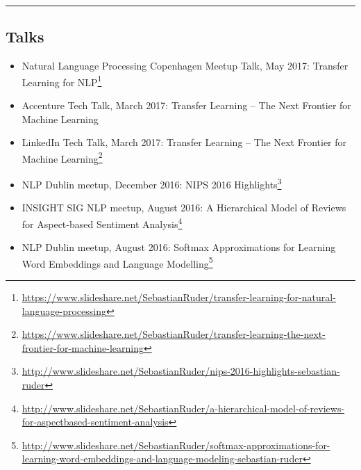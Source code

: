 \documentclass[10pt,letterpaper]{article}
\makeatletter
\newcommand{\headerrow}[2]
{\begin{tabular*}{\linewidth}{l@{\extracolsep{\fill}}r}
	#1 &
	#2 \\
\end{tabular*}}
\makeatother
\begin{document}
%
%	
%

\hrule
\vspace{-0.4em}
\subsection*{Talks}

\begin{itemize}
	\parskip=0.1em
	
	\item Natural Language Processing Copenhagen Meetup Talk, May 2017: Transfer Learning for NLP\footnote{\url{https://www.slideshare.net/SebastianRuder/transfer-learning-for-natural-language-processing}}
	
	\item Accenture Tech Talk, March 2017: Transfer Learning -- The Next Frontier for Machine Learning
	
	\item LinkedIn Tech Talk, March 2017: Transfer Learning -- The Next Frontier for Machine Learning\footnote{\url{https://www.slideshare.net/SebastianRuder/transfer-learning-the-next-frontier-for-machine-learning}}
	
	\item NLP Dublin meetup, December 2016: NIPS 2016 Highlights\footnote{\url{http://www.slideshare.net/SebastianRuder/nips-2016-highlights-sebastian-ruder}}
	
	\item INSIGHT SIG NLP meetup, August 2016: A Hierarchical Model of Reviews for Aspect-based Sentiment Analysis\footnote{\url{http://www.slideshare.net/SebastianRuder/a-hierarchical-model-of-reviews-for-aspectbased-sentiment-analysis}}
	
	\item NLP Dublin meetup, August 2016: Softmax Approximations for Learning Word Embeddings and Language Modelling\footnote{\url{http://www.slideshare.net/SebastianRuder/softmax-approximations-for-learning-word-embeddings-and-language-modeling-sebastian-ruder}}
	
\end{itemize}
\end{document}
